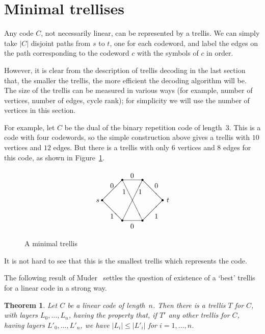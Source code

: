 \documentclass[12pt]{article}
\newtheorem{theorem}{Theorem}[section]
\begin{document}
\section{Minimal trellises}

Any code $C$, not necessarily linear, can be represented by a
trellis. We can simply take $|C|$ disjoint paths from $s$ to $t$,
one for each codeword, and label the edges on the path
corresponding to the codeword $c$ with the symbols of $c$ in
order.

However, it is clear from the description of trellis decoding
in the last section that, the smaller the trellis, the more
efficient the decoding algorithm will be. The size of the trellis
can be measured in various ways (for example, number of vertices,
number of edges, cycle rank); for simplicity we will use the
number of vertices in this section.

For example, let $C$ be the dual of the binary repetition code of
length~$3$. This is a code with four codewords, so the simple
construction above gives a trellis with $10$ vertices and $12$
edges. But there is a trellis with only $6$ vertices and $8$ edges
for this code, as shown in Figure~\ref{f:ew}.

\begin{figure}[htb]
\[\setlength{\unitlength}{1mm}
\begin{picture}(40,30)
\multiput(5,15)(30,0){2}{\circle*{1}}
\multiput(15,25)(10,0){2}{\circle*{1}}
\multiput(15,5)(10,0){2}{\circle*{1}}
\multiput(15,5)(0,20){2}{\line(1,0){10}}
\multiput(5,15)(20,-10){2}{\line(1,1){10}}
\multiput(5,15)(20,10){2}{\line(1,-1){10}}
\put(15,5){\line(1,2){10}}
\put(15,25){\line(1,-2){10}}
\put(9,21){$0$}
\put(19,26){$0$}
\put(31,21){$0$}
\put(9,6){$1$}
\put(19,1){$0$}
\put(31,6){$1$}
\put(2,14){$s$}
\put(37,14){$t$}
\put(15,18){$1$}
\put(23,18){$1$}
\end{picture}\]
\caption{A minimal trellis}
\label{f:ew}
\end{figure}

It is not hard to see that this is the smallest trellis which
represents the code.

The following result of Muder~\cite{muder} settles the question of
existence of a `best' trellis for a linear code in a strong
way.

\begin{theorem}
Let $C$ be a linear code of length~$n$. Then there is a trellis $T$
for $C$, with layers $L_0, \ldots, L_n$, having the property that,
if $T'$ any other trellis for $C$, having layers
$L'_0, \ldots, L'_n$, we have $|L_i|\le|L'_i|$ for
$i=1, \ldots, n$.
\end{theorem}
\end{document}
